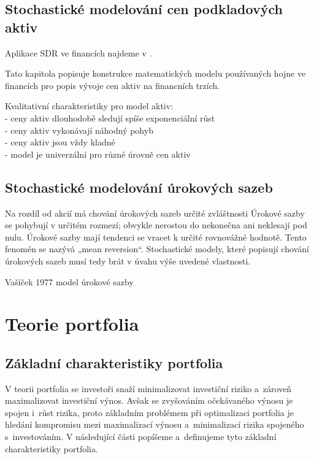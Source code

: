 \documentclass[a4paper,12pt]{report}
\theoremstyle{definition} \newtheorem{definice}[veta]{Definice}
\theoremstyle{remark}
\begin{document}
\section{Stochastické modelování cen podkladových aktiv}
Aplikace SDR ve financích najdeme v \cite{karatzas2012brownian}.

Tato kapitola popisuje konstrukce matematických modelu používaných hojne ve
financích pro popis vývoje cen aktiv na financních trzích.

Kvalitativní charakteristiky pro model aktiv:\\
- ceny aktiv dlouhodobě sledují spíše exponenciální růst\\
- ceny aktiv vykonávají náhodný pohyb\\
- ceny aktiv jsou vždy kladné\\
- model je univerzální pro různé úrovně cen aktiv\\

\section{Stochastické modelování úrokových sazeb}
Na rozdíl od akcií má chování úrokových sazeb určité zvláštnosti
Úrokové sazby se pohybují v určitém rozmezí; obvykle nerostou do nekonečna ani neklesají pod nulu.
Úrokové sazby mají tendenci se vracet k určité rovnovážné hodnotě.
Tento fenomén se nazývá „mean reversion“.
Stochastické modely, které popisují chování úrokových sazeb musí tedy brát v úvahu výše uvedené vlastnosti.

Vašíček 1977 model úrokové sazby


\chapter{Teorie portfolia}


\section{Základní charakteristiky portfolia}
V teorii portfolia se investoři snaží minimalizovat investiční riziko a~zároveň maximalizovat investiční výnos. 
Avšak se zvyšováním očekávaného výnosu je spojen i~růst rizika, proto základním problémem při optimalizaci portfolia je hledání kompromisu mezi maximalizací výnosu a~minimalizací rizika spojeného s~investováním.  
V následující části popíšeme a~definujeme tyto základní charakteristiky portfolia.
\end{document}
